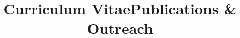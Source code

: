 \documentclass[10pt,a4paper]{moderncv} %
\title{Curriculum Vitae}
\begin{document}


%
%
%



\makecvtitle %









%


%
%

\clearpage
\title{Publications \& Outreach}
\maketitle



%
%
%

\end{document}
